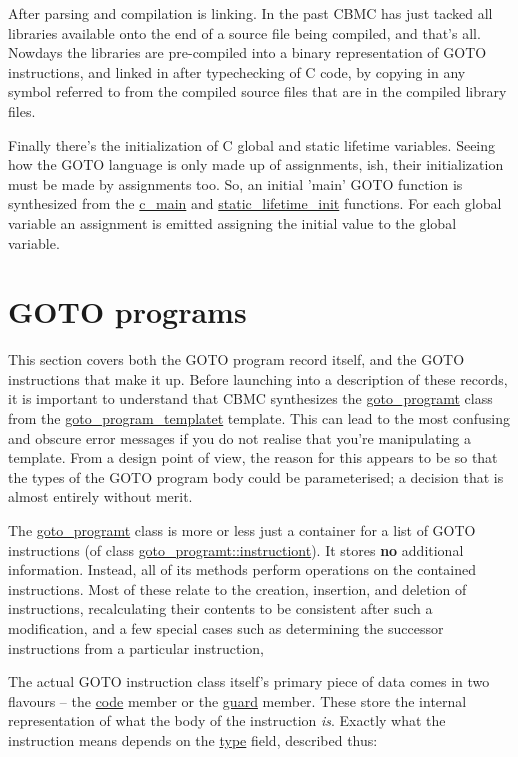 \documentclass{article}
\begin{document}
After parsing and compilation is linking. In the past CBMC has just
tacked all libraries available onto the end of a source file being compiled,
and that's all. Nowdays the libraries are pre-compiled into a binary
representation of GOTO instructions, and linked in after typechecking of C
code, by copying in any symbol referred to from the compiled source files
that are in the compiled library files.

Finally there's the initialization of C global and static lifetime variables.
Seeing how the GOTO language is only made up of assignments, ish, their
initialization must be made by assignments too. So, an initial 'main' GOTO
function is synthesized from the \url{c_main} and
\url{static_lifetime_init} functions. For each global variable an
assignment is emitted assigning the initial value to the global variable.

\section{GOTO programs}

This section covers both the GOTO program record itself, and the GOTO
instructions that make it up. Before launching into a description of these
records, it is important to understand that CBMC synthesizes the
\url{goto_programt} class from the \url{goto_program_templatet}
template. This can lead to the most confusing and obscure error messages
if you do not realise that you're manipulating a template. From a design
point of view, the reason for this appears to be so that the types of
the GOTO program body could be parameterised; a decision that is almost
entirely without merit.

The \url{goto_programt} class is more or less just a container for a
list of GOTO instructions (of class \url{goto_programt::instructiont}).
It stores \textbf{no} additional information. Instead, all of its methods
perform operations on the contained instructions. Most of these relate
to the creation, insertion, and deletion of instructions, recalculating
their contents to be consistent after such a modification, and a few
special cases such as determining the successor instructions from a
particular instruction,

The actual GOTO instruction class itself's primary piece of data comes in
two flavours -- the \url{code} member or the \url{guard} member.
These store the internal representation of what the body of the instruction
\textit{is}. Exactly what the instruction means depends on the \url{type}
field, described thus:
\end{document}
